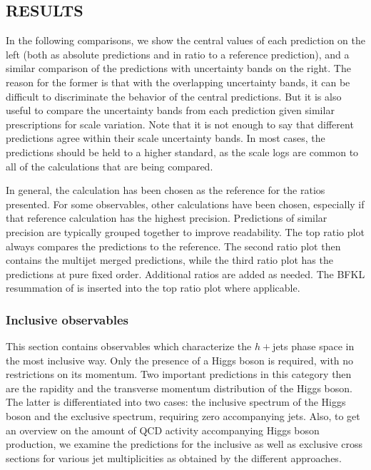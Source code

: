 \subsection{RESULTS}
\label{sec:hjetscomp:results}

In the following comparisons, we show the central
values of each prediction on the left (both as absolute predictions
and in ratio to a reference prediction), and a similar comparison of
the predictions with uncertainty bands on the right. The reason for
the former is that with the overlapping uncertainty bands, it can be
difficult to discriminate the behavior of the central predictions. But
it is also useful to compare the uncertainty bands from each
prediction given similar prescriptions for scale variation.  Note that
it is not enough to say that different predictions agree within their
scale uncertainty bands. In most cases, the predictions should be held
to a higher standard, as the scale logs are common to all of the
calculations that are being compared.

In general, the \hjetscompPowheg \hjetscompNNLOPS calculation has been chosen as the 
reference for the ratios presented. For some observables, other calculations
have been chosen, especially if that reference calculation has the highest
precision. Predictions of similar precision are typically grouped together 
to improve readability. The top ratio plot always compares the \hjetscompNNLOPS 
predictions to the reference. 
The second ratio plot then contains the multijet merged predictions, while 
the third ratio plot has the predictions at pure fixed order. Additional ratios are added as needed. The BFKL resummation 
of \hjetscompHej is inserted into the top ratio plot where applicable.



\subsubsection{Inclusive observables}
\label{sec:hjetscomp:results:inclobs}

This section contains observables which characterize the $h+{}$jets
phase space in the most inclusive way. Only the presence of a Higgs
boson is required, with no restrictions on its momentum. Two important
predictions in this category then are  the rapidity and the transverse momentum
distribution of the Higgs boson. The latter is differentiated into
two cases: the inclusive spectrum of the Higgs boson and the exclusive spectrum, requiring
zero  accompanying jets. Also, to get an overview on the amount
of QCD activity accompanying Higgs boson production, we examine the predictions for 
the inclusive as well as exclusive cross sections for various jet
multiplicities as obtained by the different approaches.

